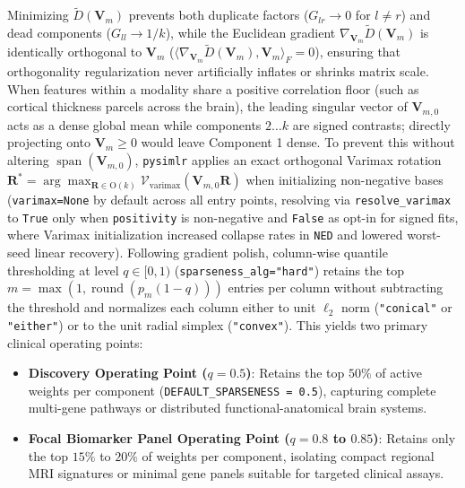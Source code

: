 \documentclass[
  10pt,
  letterpaper,
]{report}
\providecommand{\tightlist}{%
  \setlength{\itemsep}{0pt}\setlength{\parskip}{0pt}}
\begin{document}
Minimizing \(\tilde{D}(\mathbf{V}_m)\) prevents both duplicate factors
(\(G_{lr} \to 0\) for \(l \neq r\)) and dead components
(\(G_{ll} \to 1/k\)), while the Euclidean gradient
\(\nabla_{\mathbf{V}_m} \tilde{D}(\mathbf{V}_m)\) is identically
orthogonal to \(\mathbf{V}_m\)
(\(\langle \nabla_{\mathbf{V}_m} \tilde{D}(\mathbf{V}_m), \mathbf{V}_m \rangle_F = 0\)),
ensuring that orthogonality regularization never artificially inflates
or shrinks matrix scale. When features within a modality share a
positive correlation floor (such as cortical thickness parcels across
the brain), the leading singular vector of \(\mathbf{V}_{m,0}\) acts as
a dense global mean while components \(2 \dots k\) are signed contrasts;
directly projecting onto \(\mathbf{V}_m \ge 0\) would leave Component 1
dense. To prevent this without altering
\(\operatorname{span}(\mathbf{V}_{m,0})\), \texttt{pysimlr} applies an
exact orthogonal Varimax rotation
\(\mathbf{R}^* = \arg\max_{\mathbf{R} \in \mathrm{O}(k)} \mathcal{V}_{\text{varimax}}(\mathbf{V}_{m,0}\mathbf{R})\)
when initializing non-negative bases (\texttt{varimax=None} by default
across all entry points, resolving via \texttt{resolve\_varimax} to
\texttt{True} only when \texttt{positivity} is non-negative and
\texttt{False} as opt-in for signed fits, where Varimax initialization
increased collapse rates in \texttt{NED} and lowered worst-seed linear
recovery). Following gradient polish, column-wise quantile thresholding
at level \(q \in [0, 1)\) (\texttt{sparseness\_alg="hard"}) retains the
top \(m = \max(1, \operatorname{round}(p_m(1 - q)))\) entries per column
without subtracting the threshold and normalizes each column either to
unit \(\ell_2\) norm (\texttt{"conical"} or \texttt{"either"}) or to the
unit radial simplex (\texttt{"convex"}). This yields two primary
clinical operating points:

\begin{itemize}
\tightlist
\item
  \textbf{Discovery Operating Point (\(q = 0.5\))}: Retains the top
  \(50\%\) of active weights per component
  (\texttt{DEFAULT\_SPARSENESS\ =\ 0.5}), capturing complete multi-gene
  pathways or distributed functional-anatomical brain systems.
\item
  \textbf{Focal Biomarker Panel Operating Point (\(q = 0.8\) to
  \(0.85\))}: Retains only the top \(15\%\) to \(20\%\) of weights per
  component, isolating compact regional MRI signatures or minimal gene
  panels suitable for targeted clinical assays.
\end{itemize}
\end{document}
